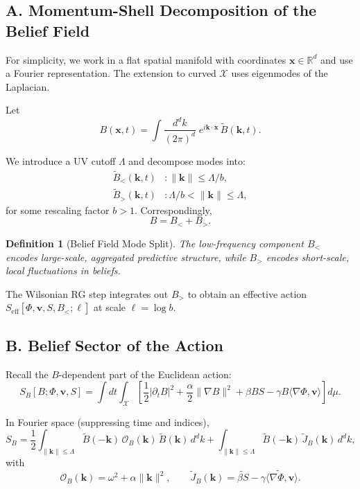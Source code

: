 \documentclass[12pt]{article}
\newtheorem{definition}{Definition}
\begin{document}
\subsection*{A. Momentum-Shell Decomposition of the Belief Field}

For simplicity, we work in a flat spatial manifold with coordinates
$\mathbf{x}\in\mathbb{R}^d$ and use a Fourier representation. The
extension to curved $\mathcal{X}$ uses eigenmodes of the Laplacian.

Let
\[
B(\mathbf{x},t)
=
\int \frac{d^d k}{(2\pi)^d}\;
e^{i\mathbf{k}\cdot\mathbf{x}}\,
\tilde{B}(\mathbf{k},t).
\]

We introduce a UV cutoff $\Lambda$ and decompose modes into:
\begin{align}
\tilde{B}_{<}(\mathbf{k},t) &: \|\mathbf{k}\| \le \Lambda/b,\\
\tilde{B}_{>}(\mathbf{k},t) &: \Lambda/b < \|\mathbf{k}\| \le \Lambda,
\end{align}
for some rescaling factor $b>1$. Correspondingly,
\[
B = B_{<} + B_{>}.
\]

\begin{definition}[Belief Field Mode Split]
The low-frequency component $B_{<}$ encodes large-scale, aggregated 
predictive structure, while $B_{>}$ encodes short-scale, local
fluctuations in beliefs.
\end{definition}

The Wilsonian RG step integrates out $B_{>}$ to obtain an effective
action $S_{\text{eff}}[\Phi,\mathbf{v},S,B_{<};\ell]$ at scale
$\ell = \log b$.

\subsection*{B. Belief Sector of the Action}

Recall the $B$-dependent part of the Euclidean action:
\[
S_B[B;\Phi,\mathbf{v},S]
=
\int dt \int_{\mathcal{X}}
\left[
\frac{1}{2}|\partial_t B|^2
+ \frac{\alpha}{2}\|\nabla B\|^2
+ \beta B S
- \gamma B \langle \nabla \Phi,\mathbf{v}\rangle
\right] d\mu.
\]

In Fourier space (suppressing time and indices),
\[
S_B
=
\frac{1}{2}
\int_{\|\mathbf{k}\|\le\Lambda}
\tilde{B}(-\mathbf{k})\,
\mathcal{O}_B(\mathbf{k})\,
\tilde{B}(\mathbf{k})\, d^d k
+
\int_{\|\mathbf{k}\|\le\Lambda}
\tilde{B}(-\mathbf{k})\,\tilde{J}_B(\mathbf{k})\, d^d k,
\]
with
\[
\mathcal{O}_B(\mathbf{k})
=
\omega^2 + \alpha \|\mathbf{k}\|^2, 
\qquad
\tilde{J}_B(\mathbf{k})
=
\widetilde{\beta S}
    - \widetilde{\gamma \langle\nabla\Phi,\mathbf{v}\rangle}.
\]
\end{document}
